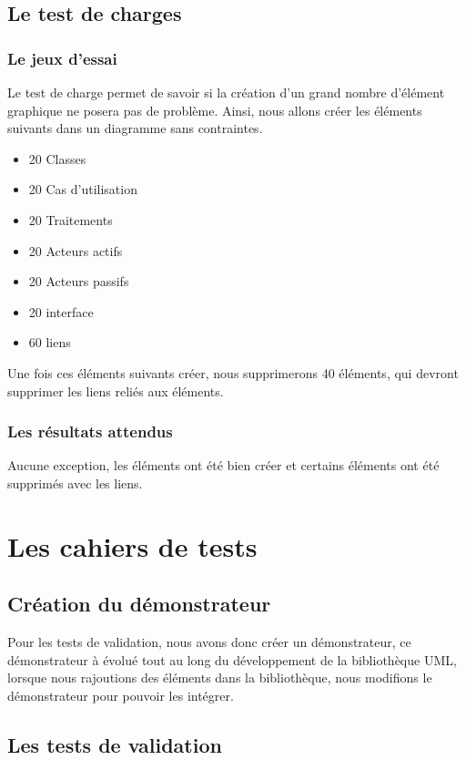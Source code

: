 \documentclass[12pt,a4paper,openany]{report}
\begin{document}
	\section{Le test de charges}
		\subsection{Le jeux d'essai}
		Le test de charge permet de savoir si la création d'un grand nombre d'élément graphique ne posera pas de problème. 
		Ainsi, nous allons créer les éléments suivants dans un diagramme sans contraintes.
		\begin{itemize}
			\item 20 Classes
			\item 20 Cas d'utilisation
			\item 20 Traitements
			\item 20 Acteurs actifs
			\item 20 Acteurs passifs
			\item 20 interface 
			\item 60 liens
		\end{itemize}
		Une fois ces éléments suivants créer, nous supprimerons 40 éléments, qui devront supprimer les liens reliés aux éléments.
		\subsection{Les résultats attendus}
		Aucune exception, les éléments ont été bien créer et certains éléments ont été supprimés avec les liens.
	\chapter{Les cahiers de tests}	
	\section{Création du démonstrateur}
	Pour les tests de validation, nous avons donc créer un démonstrateur, ce démonstrateur à évolué tout au long du développement de la bibliothèque UML, 
	lorsque nous rajoutions des éléments dans la bibliothèque, nous modifions le démonstrateur pour pouvoir les intégrer.
	\newpage
	\section{Les tests de validation}
\end{document}
